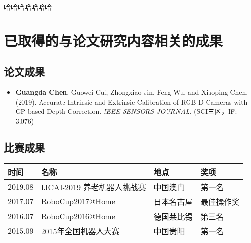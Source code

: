 \documentclass[cs4size,openany,oneside,UTF8,nofonts]{ctexbook}
\begin{document}
\newpage
哈哈哈哈哈哈哈 \cite{陈赢峰机器人导航的研究}
\newpage

\addtolength{\bibsep}{-0.8em}
\nocite{*}


\newpage
\section{已取得的与论文研究内容相关的成果}
\subsection{论文成果}
\begin{itemize}
  \item \textbf{Guangda Chen}, Guowei Cui, Zhongxiao Jin, Feng Wu, and Xiaoping Chen. (2019). Accurate Intrinsic and Extrinsic Calibration 
  of RGB-D Cameras with GP-based Depth Correction. \textit{IEEE SENSORS JOURNAL}. (SCI三区，IF: 3.076)
\end{itemize}
\subsection{比赛成果}
\begin{table}[!htbp]
  \vspace{-0.5em}\label{table1}\centering{}
  \begin{tabular}{llll}
  \toprule
  时间 & 名称 & 地点 & 奖项\\
  \midrule
  2019.08 & IJCAI-2019 养老机器人挑战赛 & 中国澳门 & 第一名\\
  2017.07 & RoboCup2017@Home & 日本名古屋 & 最佳操作奖\\
  2016.07 & RoboCup2016@Home & 德国莱比锡 & 第三名\\
  2015.09 & 2015年全国机器人大赛 & 中国贵阳 & 第一名\\
  \bottomrule
  \end{tabular}
\end{table}
\end{document}
